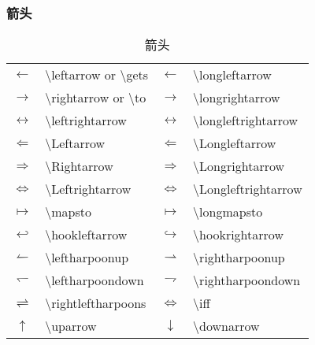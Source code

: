\documentclass[a4paper]{ctexart}
\begin{document}
    \subsubsection{箭头}
    \begin{table}[H]
        \centering
        \caption{箭头}
        \begin{tabular}{clcl}
            $\leftarrow$            & \textbackslash leftarrow or  \textbackslash gets  & $\longleftarrow$            & \textbackslash longleftarrow        \\
            $\rightarrow$           & \textbackslash rightarrow or \textbackslash to    & $\longrightarrow$           & \textbackslash longrightarrow       \\
            $\leftrightarrow$       & \textbackslash leftrightarrow                     & $\longleftrightarrow$       & \textbackslash longleftrightarrow   \\
            $\Leftarrow$            & \textbackslash Leftarrow                          & $\Longleftarrow$            & \textbackslash Longleftarrow        \\
            $\Rightarrow$           & \textbackslash Rightarrow                         & $\Longrightarrow$           & \textbackslash Longrightarrow       \\
            $\Leftrightarrow$       & \textbackslash Leftrightarrow                     & $\Longleftrightarrow$       & \textbackslash Longleftrightarrow   \\
            $\mapsto$               & \textbackslash mapsto                             & $\longmapsto$               & \textbackslash longmapsto           \\
            $\hookleftarrow$        & \textbackslash hookleftarrow                      & $\hookrightarrow$           & \textbackslash hookrightarrow       \\
            $\leftharpoonup$        & \textbackslash leftharpoonup                      & $\rightharpoonup$           & \textbackslash rightharpoonup       \\
            $\leftharpoondown$      & \textbackslash leftharpoondown                    & $\rightharpoondown$         & \textbackslash rightharpoondown     \\
            $\rightleftharpoons$    & \textbackslash rightleftharpoons                  & $\iff$                      & \textbackslash iff                  \\
            $\uparrow$              & \textbackslash uparrow                            & $\downarrow$                & \textbackslash downarrow            \\

\end{tabular}
\end{table}
\end{document}
